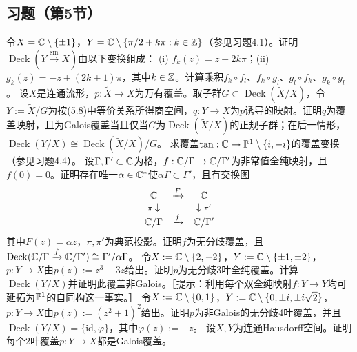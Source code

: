 \subsection*{习题（第5节）}
令$X=\mathbb C\setminus\{\pm1\}$，$Y=\mathbb C\setminus\{\pi/2+k\pi:k\in\mathbb Z\}$（参见习题4.1）。证明$\operatorname{Deck}(Y\xrightarrow{\sin}X)$由以下变换组成：
(i) $f_k(z)=z+2k\pi$；(ii) $g_k(z)=-z+(2k+1)\pi$，其中$k\in\mathbb Z$。计算乘积$f_k\circ f_l$、$f_k\circ g_l$、$g_l\circ f_k$、$g_k\circ g_l$。
设$X$是连通流形，$p:\widetilde X\to X$为万有覆盖。取子群$G\subset\operatorname{Deck}(\widetilde X/X)$，令$Y:=\widetilde X/G$为按(5.8)中等价关系所得商空间，$q:Y\to X$为$p$诱导的映射。证明$q$为覆盖映射，且为Galois覆盖当且仅当$G$为$\operatorname{Deck}(\widetilde X/X)$的正规子群；在后一情形，$\operatorname{Deck}(Y/X)\cong\operatorname{Deck}(\widetilde X/X)/G$。
求覆盖$\tan:\mathbb C\to\mathbb P^1\setminus\{i,-i\}$的覆盖变换（参见习题4.4）。
设$\Gamma,\Gamma'\subset\mathbb C$为格，$f:\mathbb C/\Gamma\to\mathbb C/\Gamma'$为非常值全纯映射，且$f(0)=0$。证明存在唯一$\alpha\in\mathbb C^*$使$\alpha\Gamma\subset\Gamma'$，且有交换图
\[
\begin{array}{ccc}\mathbb C&\xrightarrow{F}&\mathbb C\\ {\scriptstyle\pi}\downarrow&&\downarrow{\scriptstyle\pi'}\\ \mathbb C/\Gamma&\xrightarrow{f}&\mathbb C/\Gamma'\end{array}
\]
其中$F(z)=\alpha z$，$\pi,\pi'$为典范投影。证明$f$为无分歧覆盖，且$\operatorname{Deck}(\mathbb C/\Gamma\xrightarrow{f}\mathbb C/\Gamma')\cong\Gamma'/\alpha\Gamma$。
令$X:=\mathbb C\setminus\{2,-2\}$，$Y:=\mathbb C\setminus\{\pm1,\pm2\}$，$p:Y\to X$由$p(z):=z^3-3z$给出。证明$p$为无分歧3叶全纯覆盖。计算$\operatorname{Deck}(Y/X)$并证明此覆盖非Galois。［提示：利用每个双全纯映射$f:Y\to Y$均可延拓为$\mathbb P^1$的自同构这一事实。］
令$X:=\mathbb C\setminus\{0,1\}$，$Y:=\mathbb C\setminus\{0,\pm i,\pm i\sqrt2\}$，$p:Y\to X$由$p(z):=(z^2+1)^2$给出。证明$p$为非Galois的无分歧4叶覆盖，并且$\operatorname{Deck}(Y/X)=\{\mathrm{id},\varphi\}$，其中$\varphi(z):=-z$。
设$X,Y$为连通Hausdorff空间。证明每个2叶覆盖$p:Y\to X$都是Galois覆盖。
